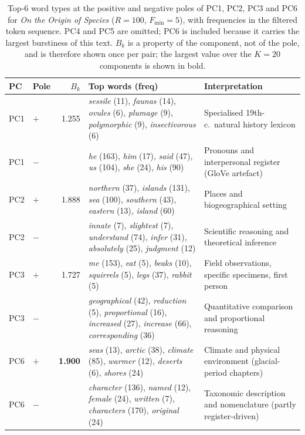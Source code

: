 \documentclass[preprint]{elsarticle}
\begin{document}
\begin{table}[tbp]
\centering
\caption{Top-6 word types at the positive and negative poles of PC1,
PC2, PC3 and PC6 for \emph{On the Origin of Species} ($R=100$,
$F_{\min}=5$), with frequencies in the filtered token sequence.
PC4 and PC5 are omitted; PC6 is included because it carries the largest
burstiness of this text.
$B_k$ is a property of the component, not of the pole, and is therefore
shown once per pair; the largest value over the $K=20$ components is
shown in bold.}
\label{tab:darwin_pc}
\small
\setlength{\tabcolsep}{4pt}
\begin{tabular}{llr p{5.4cm} p{4.4cm}}
\toprule
PC & Pole & $B_k$ & Top words (freq) & Interpretation \\
\midrule
PC1 & $+$ & 1.255 &
  \emph{sessile} (11), \emph{faunas} (14), \emph{ovules} (6),
  \emph{plumage} (9), \emph{polymorphic} (9), \emph{insectivorous} (6)
  & Specialised 19th-c.\ natural history lexicon \\
PC1 & $-$ & &
  \emph{he} (163), \emph{him} (17), \emph{said} (47),
  \emph{us} (104), \emph{she} (24), \emph{his} (90)
  & Pronouns and interpersonal register (GloVe artefact) \\
\midrule
PC2 & $+$ & 1.888 &
  \emph{northern} (37), \emph{islands} (131), \emph{sea} (100),
  \emph{southern} (43), \emph{eastern} (13), \emph{island} (60)
  & Places and biogeographical setting \\
PC2 & $-$ & &
  \emph{innate} (7), \emph{slightest} (7), \emph{understand} (74),
  \emph{infer} (31), \emph{absolutely} (25), \emph{judgment} (12)
  & Scientific reasoning and theoretical inference \\
\midrule
PC3 & $+$ & 1.727 &
  \emph{me} (153), \emph{eat} (5), \emph{beaks} (10),
  \emph{squirrels} (5), \emph{legs} (37), \emph{rabbit} (5)
  & Field observations, specific specimens, first person \\
PC3 & $-$ & &
  \emph{geographical} (42), \emph{reduction} (5),
  \emph{proportional} (16), \emph{increased} (27),
  \emph{increase} (66), \emph{corresponding} (36)
  & Quantitative comparison and proportional reasoning \\
\midrule
PC6 & $+$ & \textbf{1.900} &
  \emph{seas} (13), \emph{arctic} (38), \emph{climate} (85),
  \emph{warmer} (12), \emph{deserts} (6), \emph{shores} (24)
  & Climate and physical environment (glacial-period chapters) \\
PC6 & $-$ & &
  \emph{character} (136), \emph{named} (12), \emph{female} (24),
  \emph{written} (7), \emph{characters} (170), \emph{original} (24)
  & Taxonomic description and nomenclature (partly register-driven) \\
\bottomrule
\end{tabular}
\end{table}
\end{document}
